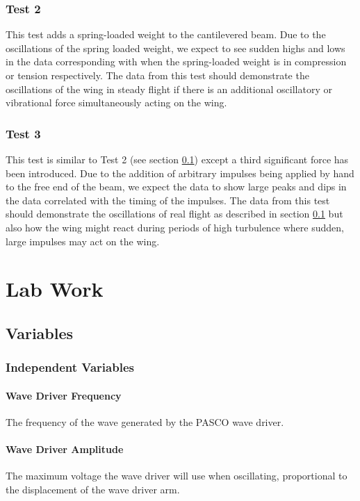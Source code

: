 \documentclass[12 pt]{report}
\begin{document}
\subsection{Test 2} \label{test_2}
This test adds a spring-loaded weight to the cantilevered beam. Due to the oscillations of the spring loaded weight, we expect to see sudden highs and lows in the data corresponding with when the spring-loaded weight is in compression or tension respectively. The data from this test should demonstrate the oscillations of the wing in steady flight if there is an additional oscillatory or vibrational force simultaneously acting on the wing.

\subsection{Test 3} \label{test_3}
This test is similar to Test 2 (see section \ref{test_2}) except a third significant force has been introduced. Due to the addition of arbitrary impulses being applied by hand to the free end of the beam, we expect the data to show large peaks and dips in the data correlated with the timing of the impulses. The data from this test should demonstrate the oscillations of real flight as described in section \ref{test_2} but also how the wing might react during periods of high turbulence where sudden, large impulses may act on the wing.

\chapter{Lab Work} \label{lab_work}
\section{Variables} \label{variables}
\subsection{Independent Variables} \label{independent_variables}
\subsubsection{Wave Driver Frequency} \label{wave_drive_frequency}
The frequency of the wave generated by the PASCO wave driver.

\subsubsection{Wave Driver Amplitude} \label{wave_driver_amplitude}
The maximum voltage the wave driver will use when oscillating, proportional to the displacement of the wave driver arm.
\end{document}
